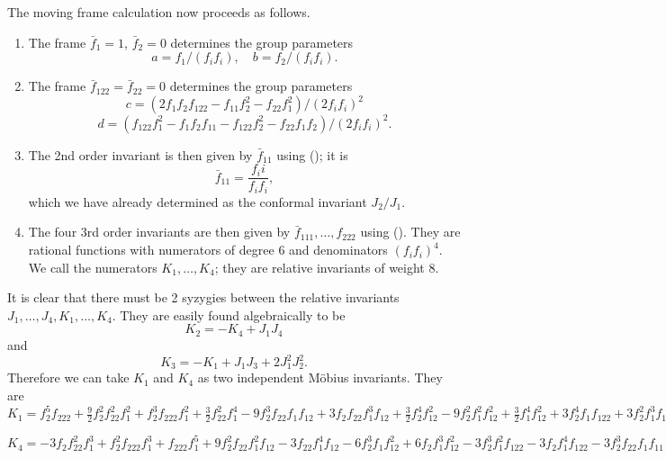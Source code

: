 \documentclass{article}
\begin{document}
The moving frame calculation now proceeds as follows.
\begin{enumerate}
\item The frame $\bar f_1=1$, $\bar f_2=0$ determines the group parameters
$$ a = f_1/(f_i f_i),\quad b = f_2/(f_i f_i).$$

\item The frame $\bar f_{122}=\bar f_{22}=0$ determines the group parameters
$$ c = (2 f_1f_2f_{122} - f_{11}f_2^2 - f_{22}f_1^2)/(2 f_i f_i)^2$$
$$ d = (f_{122}f_1^2 - f_1 f_2 f_{11} - f_{122}f_2^2 - f_{22} f_1 f_2)/(2 f_i f_i)^2.$$

\item The 2nd order invariant is then given by $\bar f_{11}$ using (); it is 
$$\bar f_{11} = \frac{f_ii}{f_i f_i},$$
which we have already determined as the conformal invariant $J_2/J_1$.

\item The four 3rd order invariants are then given by $\bar f_{111},\dots,f_{222}$ using (). They are
rational functions with numerators of degree 6 and denominators $(f_i f_i)^4$. We call
the numerators $K_1,\dots, K_4$; they are relative invariants of weight 8.
\end{enumerate}

It is clear that there must be 2 syzygies between the relative invariants $J_1,\dots,J_4,K_1,\dots,K_4$.
They are easily found algebraically to be
$$K_2 = -K_4 + J_1 J_4$$
and
$$K_3=-K_1 +J_1 J_3 + 2 J_1^2 J_2^2.$$
Therefore we can take $K_1$ and $K_4$ as two independent M\"obius invariants. They are
$K_1=
f_2 ^5 f_{222} + \frac{9}{2} f_2 ^2 f_{22}^2 f_1 ^2 + 
 f_2 ^3 f_{222} f_1 ^2 + \frac{3}{2} f_{22}^2 f_1 ^4 - 
 9 f_2 ^3 f_{22} f_1  f_{12} + 
 3 f_2  f_{22} f_1 ^3 f_{12} + \frac{3}{2} f_2 ^4 f_{12}^2 - 
 9 f_2 ^2 f_1 ^2 f_{12}^2 + \frac{3}{2} f_1 ^4 f_{12}^2 + 
 3 f_2 ^4 f_1  f_{122} + 3 f_2 ^2 f_1 ^3 f_{122} + 
 3 f_2 ^4 f_{22} f_{11} + 3 f_{22} f_1 ^4 f_{11} + 
 3 f_2 ^3 f_1  f_{12} f_{11} - 
 9 f_2  f_1 ^3 f_{12} f_{11} + \frac{3}{2} f_2 ^4 f_{11}^2 + 
 \frac{9}{2} f_2 ^2 f_1 ^2 f_{11}^2 + 3 f_2 ^3 f_1 ^2 f_{112} + 
 3 f_2  f_1 ^4 f_{112} + f_2 ^2 f_1 ^3 f_{111} + 
 f_1 ^5 f_{111}, 
 $
 
 $K_4=-3 f_2  f_{22}^2 f_1 ^3 + 
 f_2 ^2 f_{222} f_1 ^3 + f_{222} f_1 ^5 + 
 9 f_2 ^2 f_{22} f_1 ^2 f_{12} - 
 3 f_{22} f_1 ^4 f_{12} - 6 f_2 ^3 f_1  f_{12}^2 + 
 6 f_2  f_1 ^3 f_{12}^2 - 3 f_2 ^3 f_1 ^2 f_{122} - 
 3 f_2  f_1 ^4 f_{122} - 3 f_2 ^3 f_{22} f_1  f_{11} + 
 3 f_2  f_{22} f_1 ^3 f_{11} + 3 f_2 ^4 f_{12} f_{11} - 
 9 f_2 ^2 f_1 ^2 f_{12} f_{11} + 
 3 f_2 ^3 f_1  f_{11}^2 + 3 f_2 ^4 f_1  f_{112} + 
 3 f_2 ^2 f_1 ^3 f_{112} - f_2 ^5 f_{111} - 
 f_2 ^3 f_1 ^2 f_{111}
$
\end{document}
